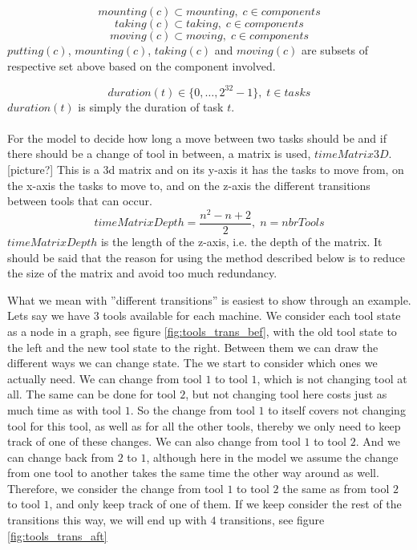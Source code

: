  \begin{equation}\label{eq:36}
 mounting(c) \subset mounting, \; c \in components
 \end{equation}
 \begin{equation}\label{eq:37}
 taking(c) \subset taking, \; c \in components
 \end{equation}
 \begin{equation}\label{eq:38}
 moving(c) \subset moving, \; c \in components
 \end{equation}
 $putting(c)$, $mounting(c)$, $taking(c)$ and $moving(c)$ are subsets of respective set above based on the component involved.
 
 \begin{equation}\label{eq:42}
 duration(t) \in \{0 , \ldots , 2^{32}-1\}, \; t \in tasks\end{equation}
 $duration(t)$ is simply the duration of task $t$.
 \\\\
 For the model to decide how long a move between two tasks should be and if there should be a change of tool in between, a matrix is used, $timeMatrix3D$.[picture?] This is a 3d matrix and on its y-axis it has the tasks to move from, on the x-axis the tasks to move to, and on the z-axis the different transitions between tools that can occur.
 \begin{equation}\label{eq:43}
 timeMatrixDepth = \frac{n^2 - n + 2}{2}, \; n = nbrTools\end{equation}
 $timeMatrixDepth$ is the length of the z-axis, i.e. the depth of the matrix. It should be said that the reason for using the method described below is to reduce the size of the matrix and avoid too much redundancy.
 
 What we mean with ''different transitions'' is easiest to show through an example. Lets say we have $3$ tools available for each machine. We consider each tool state as a node in a graph, see figure \ref{fig:tools_trans_bef}, with the old tool state to the left and the new tool state to the right. Between them we can draw the different ways we can change state. The we start to consider which ones we actually need. We can change from tool $1$ to tool $1$, which is not changing tool at all. The same can be done for tool $2$, but not changing tool here costs just as much time as with tool $1$. So the change from tool $1$ to itself covers not changing tool for this tool, as well as for all the other tools, thereby we only need to keep track of one of these changes. We can also change from tool $1$ to tool $2$. And we can change back from $2$ to $1$, although here in the model we assume the change from one tool to another takes the same time the other way around as well. Therefore, we consider the change from tool $1$ to tool $2$ the same as from tool $2$ to tool $1$, and only keep track of one of them. If we keep consider the rest of the transitions this way, we will end up with $4$ transitions, see figure \ref{fig:tools_trans_aft}
 
